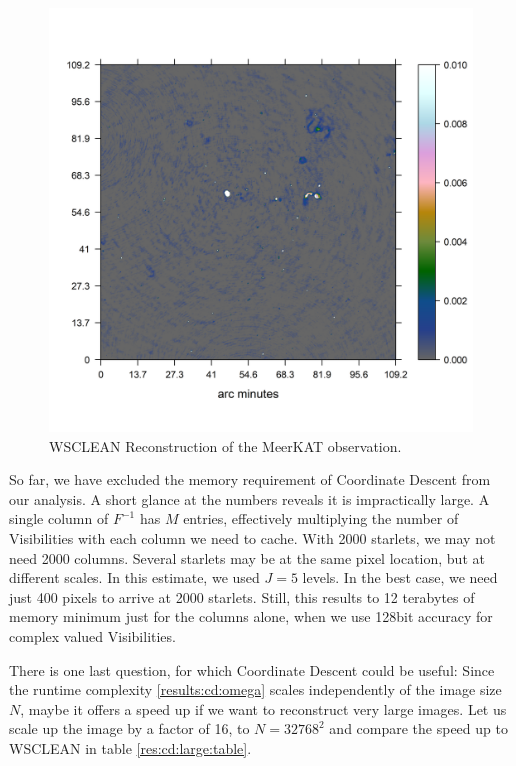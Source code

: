\begin{figure}[h]
	\centering
	\includegraphics[width=0.6\linewidth]{./chapters/21.scalability/meerkat.png}
	\caption{WSCLEAN Reconstruction of the MeerKAT observation.}
	\label{scale:wsclean}
\end{figure}

So far, we have excluded the memory requirement of Coordinate Descent from our analysis. A short glance at the numbers reveals it is impractically large. A single column of $F^{-1}$ has $M$ entries, effectively multiplying the number of Visibilities with each column we need to cache. With 2000 starlets, we may not need 2000 columns. Several starlets may be at the same pixel location, but at different scales. In this estimate, we used $J=5$ levels. In the best case, we need just 400 pixels to arrive at 2000 starlets. Still, this results to 12 terabytes of memory minimum just for the columns alone, when we use 128bit accuracy for complex valued Visibilities. 

There is one last question, for which Coordinate Descent could be useful: Since the runtime complexity \eqref{results:cd:omega} scales independently of the image size $N$, maybe it offers a speed up if we want to reconstruct very large images. Let us scale up the image by a factor of 16, to $N=32768^2$ and compare the speed up to WSCLEAN in table \ref{res:cd:large:table}. 

